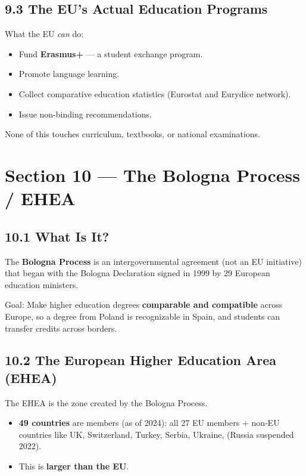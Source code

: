 	\subsection{9.3 The EU's Actual Education Programs}

	What the EU \textit{can} do:
	\begin{itemize}
		\item Fund \textbf{Erasmus+} --- a student exchange program.
		\item Promote language learning.
		\item Collect comparative education statistics (Eurostat and Eurydice network).
		\item Issue non-binding recommendations.
	\end{itemize}

	None of this touches curriculum, textbooks, or national examinations.

	\section{Section 10 --- The Bologna Process / EHEA}

	\subsection{10.1 What Is It?}

	The \textbf{Bologna Process} is an intergovernmental agreement (not an EU initiative) that began with the Bologna Declaration signed in 1999 by 29 European education ministers.

	Goal: Make higher education degrees \textbf{comparable and compatible} across Europe, so a degree from Poland is recognizable in Spain, and students can transfer credits across borders.

	\subsection{10.2 The European Higher Education Area (EHEA)}

	The EHEA is the zone created by the Bologna Process.
	\begin{itemize}
		\item \textbf{49 countries} are members (as of 2024): all 27 EU members + non-EU countries like UK, Switzerland, Turkey, Serbia, Ukraine, \etc (Russia suspended 2022).
		\item This is \textbf{larger than the EU}.
	\end{itemize}

